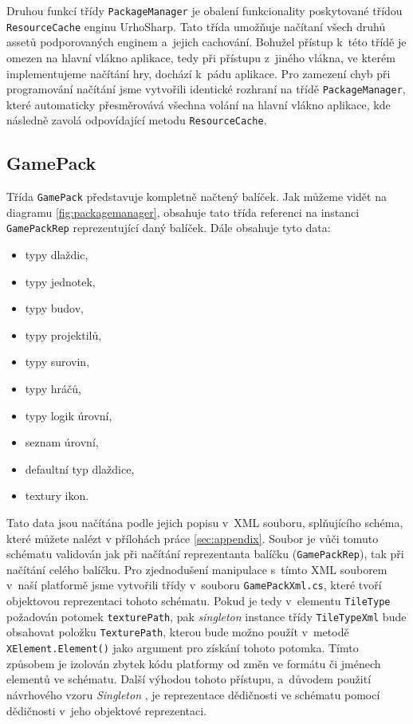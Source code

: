 Druhou funkcí třídy \texttt{PackageManager} je obalení funkcionality poskytované třídou \texttt{ResourceCache} enginu UrhoSharp. Tato třída umožňuje načítaní všech druhů assetů podporovaných enginem a~jejich cachování. Bohužel přístup k~této třídě je omezen na hlavní vlákno aplikace, tedy při přístupu z~jiného vlákna, ve kterém implementujeme načítání hry, dochází k~pádu aplikace. Pro zamezení chyb při programování načítání jsme vytvořili identické rozhraní na třídě \texttt{PackageManager}, které automaticky přesměrovává všechna volání na hlavní vlákno aplikace, kde následně zavolá odpovídající metodu \texttt{ResourceCache}.


\subsection{GamePack}
\label{sec:gamepack}


Třída \texttt{GamePack} představuje kompletně načtený balíček. Jak můžeme vidět na diagramu \ref{fig:packagemanager}, obsahuje tato třída referenci na instanci \texttt{GamePackRep} reprezentující daný balíček. Dále obsahuje tyto data:

\begin{itemize}
	\item typy dlaždic,
	\item typy jednotek,
	\item typy budov,
	\item typy projektilů,
	\item typy surovin,
	\item typy hráčů,
	\item typy logik úrovní,
	\item seznam úrovní,
	\item defaultní typ dlaždice,
	\item textury ikon.
\end{itemize}

Tato data jsou načítána podle jejich popisu v~XML souboru, splňujícího schéma, které můžete nalézt v přílohách práce \ref{sec:appendix}. Soubor je vůči tomuto schématu validován jak při načítání reprezentanta balíčku (\texttt{GamePackRep}), tak při načítání celého balíčku. Pro zjednodušení manipulace s~tímto XML souborem v~naší platformě jsme vytvořili třídy v~souboru \texttt{GamePackXml.cs}, které tvoří objektovou reprezentaci tohoto schématu. Pokud je tedy v~elementu \texttt{TileType} požadován potomek \texttt{texturePath}, pak \textit{singleton} instance třídy \texttt{TileTypeXml} bude obsahovat položku \texttt{TexturePath}, kterou bude možno použít v~metodě \texttt{XElement.Element()} jako argument pro získání tohoto potomka. Tímto způsobem je izolován zbytek kódu platformy od změn ve formátu či jménech elementů ve schématu. Další výhodou tohoto přístupu, a~důvodem použití návrhového vzoru \textit{Singleton} \citep[str.~127]{book:gangoffour}, je reprezentace dědičnosti ve schématu pomocí dědičnosti v~jeho objektové reprezentaci.

